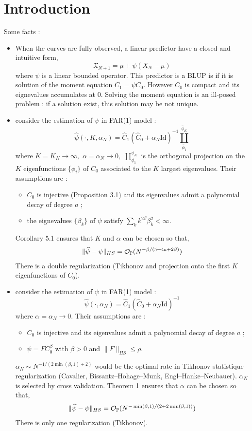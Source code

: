 \documentclass{article}
\begin{document}
	\section{Introduction}
Some facts : 
\begin{itemize}
\item When the curves are fully observed, a linear predictor have a closed and intuitive form,
$$
  \mathfrak{X}_{N+1} = \mu + \psi(X_N-\mu) 
$$
where $\psi$ is a linear bounded operator. This predictor is a BLUP is if it is solution of the moment equation $C_1=\psi C_0$. However $C_0$ is compact and its eignevalues accumulates at $0.$ Solving the moment equation is an ill-posed problem : if a solution exist, this solution may be not unique.

\item \citet{kuhnert2026} consider the estimation of $\psi$ in FAR(1) model :
$$
	\widehat{\psi}(\cdot,K,\alpha_N) = \widehat{C}_1 (\widehat{C}_0 + \alpha_N \mathrm{Id})^{-1} \coprod_{\widehat\phi_1}^{\widehat\phi_K}
$$	
where $K=K_N\to\infty,$ $\alpha=\alpha_N\to 0,$ $\coprod_{\phi_1}^{\phi_K}$ is the orthogonal projection on the $K$ eigenfunctions $\{\phi_i\}$ of $C_0$ associated to the $K$ largest eigenvalues. Their assumptions are : 
\begin{itemize}
\item $C_0$ is injective (Proposition 3.1) and its eigenvalues admit a polynomial decay of degree $a$ ;
\item the eignevalues $\{\beta_k\}$ of $\psi$ satisfy $\sum_k k^{2\beta} \beta_k^2<\infty$.
\end{itemize}
Corollary 5.1 ensures that $K$ and $\alpha$ can be chosen so that,
$$
\|\widehat\psi -\psi\|_{HS} =\mathcal{O}_{\mathbb{P}}(N^{-\beta/(5+4a+2\beta)})
$$
There is a double regularization (Tikhonov and projection onto the first $K$ eigenfunctions of $C_0$).

\item \cite{zhao2026functional} consider the estimation of $\psi$ in FAR(1) model :
$$
	\widehat{\psi}(\cdot,\alpha_N) = \widehat{C}_1 (\widehat{C}_0 + \alpha_N \mathrm{Id})^{-1}
$$	
where $\alpha=\alpha_N\to 0.$ Their assumptions are : 
\begin{itemize}
\item $C_0$ is injective and its eigenvalues admit a polynomial decay of degree $a$ ;
\item $\psi=FC_0^\beta$ with $\beta>0$ and $\|F\|_{HS}\leq \rho.$
\end{itemize}
$\alpha_N \sim N^{-1/(2\min(\beta,1)+2)}$ would be the optimal rate in Tikhonov statistique regularization (Cavalier, Bissantz–Hohage–Munk, Engl–Hanke–Neubauer). $\alpha_N$ is selected by cross validation.
Theorem 1 ensures that $\alpha$ can be chosen so that,
$$
\|\widehat\psi -\psi\|_{HS} =\mathcal{O}_{\mathbb{P}}(N^{-\min(\beta,1)/(2+2\min(\beta,1))})
$$
There is only one regularization (Tikhonov). 
\end{itemize}   
    	
\end{document}
